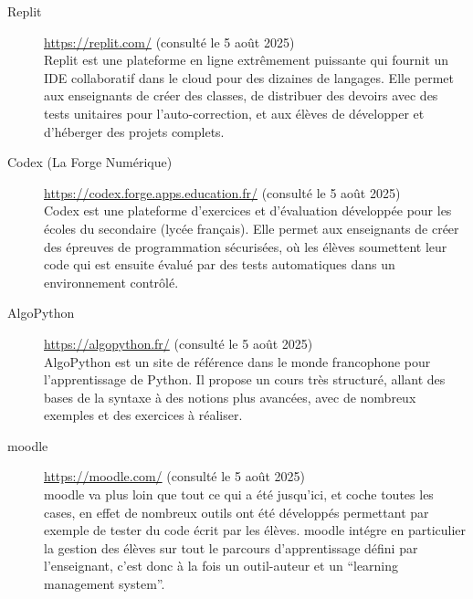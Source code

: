 \documentclass[11pt,a4paper]{article}
\begin{document}
\begin{description}
    \item[Replit] \url{https://replit.com/} (consulté le 5 août 2025) \\
    Replit est une plateforme en ligne extrêmement puissante qui fournit un IDE collaboratif dans le cloud pour des dizaines de langages. Elle permet aux enseignants de créer des classes, de distribuer des devoirs avec des tests unitaires pour l'auto-correction, et aux élèves de développer et d'héberger des projets complets.

    \item[Codex (La Forge Numérique)] \url{https://codex.forge.apps.education.fr/} (consulté le 5 août 2025) \\
    Codex est une plateforme d'exercices et d'évaluation développée pour les écoles du secondaire (lycée français). Elle permet aux enseignants de créer des épreuves de programmation sécurisées, où les élèves soumettent leur code qui est ensuite évalué par des tests automatiques dans un environnement contrôlé.

    \item[AlgoPython] \url{https://algopython.fr/} (consulté le 5 août 2025) \\
    AlgoPython est un site de référence dans le monde francophone pour l'apprentissage de Python. Il propose un cours très structuré, allant des bases de la syntaxe à des notions plus avancées, avec de nombreux exemples et des exercices à réaliser.

    \item[moodle] \url{https://moodle.com/} (consulté le 5 août 2025) \\
     moodle va plus loin que tout ce qui a été jusqu'ici, et coche toutes les cases, en effet de nombreux outils ont été développés permettant par exemple de tester du code écrit par les élèves. moodle intégre en particulier la gestion des élèves sur tout le parcours d'apprentissage défini par l'enseignant, c'est donc à la fois un outil-auteur et un “learning management system”.
     

\end{description}
\end{document}
